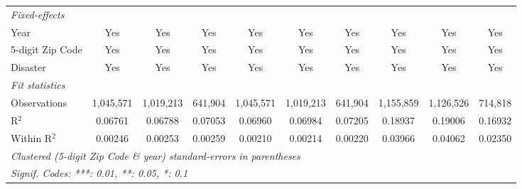 \begin{tabular}{lccccccccc}
   \midrule
   \emph{Fixed-effects}\\
   Year                                                       & Yes            & Yes            & Yes            & Yes            & Yes            & Yes            & Yes           & Yes           & Yes\\  
   5-digit Zip Code                                           & Yes            & Yes            & Yes            & Yes            & Yes            & Yes            & Yes           & Yes           & Yes\\  
   Disaster                                                   & Yes            & Yes            & Yes            & Yes            & Yes            & Yes            & Yes           & Yes           & Yes\\  
   \midrule
   \emph{Fit statistics}\\
   Observations                                               & 1,045,571      & 1,019,213      & 641,904        & 1,045,571      & 1,019,213      & 641,904        & 1,155,859     & 1,126,526     & 714,818\\  
   R$^2$                                                      & 0.06761        & 0.06788        & 0.07053        & 0.06960        & 0.06984        & 0.07205        & 0.18937       & 0.19006       & 0.16932\\  
   Within R$^2$                                               & 0.00246        & 0.00253        & 0.00259        & 0.00210        & 0.00214        & 0.00220        & 0.03966       & 0.04062       & 0.02350\\  
   \midrule \midrule
   \multicolumn{10}{l}{\emph{Clustered (5-digit Zip Code \& year) standard-errors in parentheses}}\\
   \multicolumn{10}{l}{\emph{Signif. Codes: ***: 0.01, **: 0.05, *: 0.1}}\\
\end{tabular}
\par\endgroup
